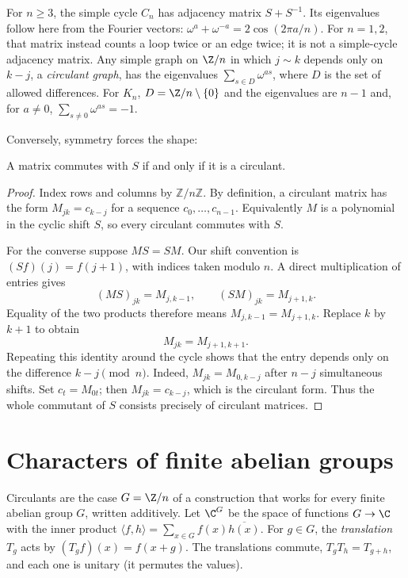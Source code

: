 \begin{example}\label{linear:exa:cycle}
For $n\ge3$, the simple cycle $C_n$ has adjacency matrix $S+S^{-1}$.
Its eigenvalues follow here from the Fourier vectors:
$\omega^a+\omega^{-a}=2\cos(2\pi a/n)$. For $n=1,2$, that matrix instead
counts a loop twice or an edge twice; it is not a simple-cycle adjacency
matrix. Any simple graph on $\Z/n$ in which $j\sim k$ depends only on $k-j$, a \emph{circulant graph},
has the eigenvalues $\sum_{s\in D}\omega^{as}$, where $D$ is the set of allowed differences. For $K_n$, $D=\Z/n\setminus\{0\}$ and
the eigenvalues are $n-1$ and, for $a\ne0$, $\sum_{s\ne0}\omega^{as}=-1$.
\end{example}

Conversely, symmetry forces the shape:

\begin{proposition}\label{linear:prop:commutant}
A matrix commutes with $S$ if and only if it is a circulant.
\end{proposition}
\begin{proof}
Index rows and columns by $\mathbb Z/n\mathbb Z$.
By definition, a circulant matrix has the form
$M_{jk}=c_{k-j}$ for a sequence $c_0,\ldots,c_{n-1}$.
Equivalently $M$ is a polynomial in the cyclic
shift $S$, so every circulant commutes with $S$.

For the converse suppose $MS=SM$.
Our shift convention is $(Sf)(j)=f(j+1)$,
with indices taken modulo $n$.
A direct multiplication of entries gives
\[
(MS)_{jk}=M_{j,k-1},
\qquad (SM)_{jk}=M_{j+1,k}.
\]
Equality of the two products therefore means
$M_{j,k-1}=M_{j+1,k}$. Replace $k$ by $k+1$
to obtain
\[
M_{jk}=M_{j+1,k+1}.
\]
Repeating this identity around the cycle
shows that the entry depends only on the
difference $k-j\pmod n$. Indeed,
$M_{jk}=M_{0,k-j}$ after $n-j$ simultaneous
shifts. Set $c_t=M_{0t}$; then
$M_{jk}=c_{k-j}$, which is the circulant form.
Thus the whole commutant of $S$ consists
precisely of circulant matrices.
\end{proof}

\section{Characters of finite abelian groups}

Circulants are the case $G=\Z/n$ of a construction that works for every finite abelian group $G$, written additively. Let $\C^G$
be the space of functions $G\to\C$ with the inner product $\langle f,h\rangle=\sum_{x\in G}f(x)\overline{h(x)}$. For $g\in G$, the
\emph{translation} $T_g$ acts by $(T_gf)(x)=f(x+g)$. The translations commute, $T_gT_h=T_{g+h}$, and each one is unitary (it
permutes the values).

